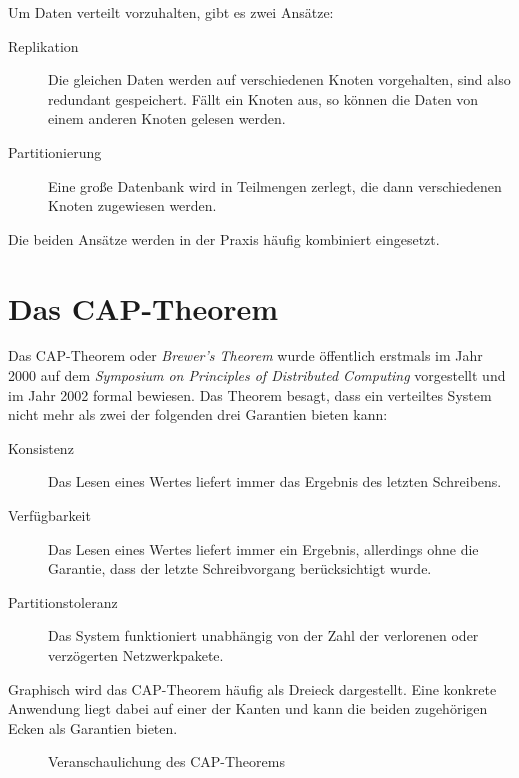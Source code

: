 \documentclass[a4paper,11pt]{scrartcl}
\begin{document}
  Um Daten verteilt vorzuhalten, gibt es zwei
  Ansätze:\cite[S.~147]{kleppmann17}

  \begin{description}
    \item[Replikation] Die gleichen Daten werden auf verschiedenen Knoten
      vorgehalten, sind also redundant gespeichert. Fällt ein Knoten aus, so
      können die Daten von einem anderen Knoten gelesen werden.
    \item[Partitionierung] Eine große Datenbank wird in Teilmengen zerlegt, die
      dann verschiedenen Knoten zugewiesen werden.
  \end{description}

  Die beiden Ansätze werden in der Praxis häufig kombiniert eingesetzt.

  \section{Das CAP-Theorem}
  Das CAP-Theorem oder \textit{Brewer's Theorem} wurde öffentlich erstmals im
  Jahr 2000 auf dem \textit{Symposium on Principles of Distributed Computing}
  vorgestellt und im Jahr 2002 formal bewiesen. Das Theorem besagt, dass ein
  verteiltes System nicht mehr als zwei der folgenden drei Garantien bieten
  kann:\cite[S.~51-59]{brewer02}

  \begin{description}
    \item[Konsistenz] Das Lesen eines Wertes liefert immer das Ergebnis des
      letzten Schreibens.
    \item[Verfügbarkeit] Das Lesen eines Wertes liefert immer ein Ergebnis,
      allerdings ohne die Garantie, dass der letzte Schreibvorgang berücksichtigt
      wurde.
    \item[Partitionstoleranz] Das System funktioniert unabhängig von der Zahl der
      verlorenen oder verzögerten Netzwerkpakete.
  \end{description}

  Graphisch wird das CAP-Theorem häufig als Dreieck dargestellt. Eine konkrete
  Anwendung liegt dabei auf einer der Kanten und kann die beiden zugehörigen
  Ecken als Garantien bieten.

  \begin{figure}[!h]
    \centering
    \caption{Veranschaulichung des CAP-Theorems}
  \end{figure}
\end{document}
